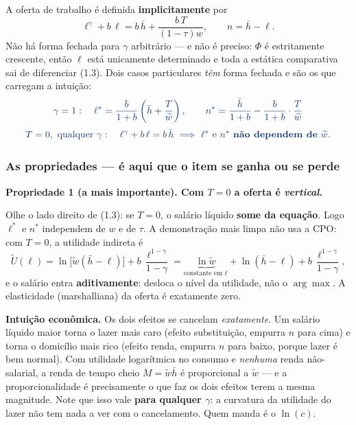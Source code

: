\documentclass[11pt, a4paper]{article}
\newcommand{\passo}[1]{\medskip\noindent\textbf{#1}\par\nobreak}
\newcommand{\intuicao}[1]{%
  \medskip\noindent\textcolor{midblue}{\textbf{Intuição econômica.}} #1\par}
\newcommand{\resp}[1]{%
  \ifmmode {\color{darkblue}#1}\else\textcolor{darkblue}{\textbf{#1}}\fi}
\newcommand{\stst}{^{\ast}}
\newcommand{\wt}{\widetilde{w}}
\begin{document}
\begin{tcolorbox}[theorybox, title={Resposta do item (a)}]
\small
A oferta de trabalho é definida \textbf{implicitamente} por
\[
\ell^{\gamma} + b\,\ell = b\,\bar h + \frac{b\,T}{(1-\tau)w},
\qquad n = \bar h - \ell .
\]
Não há forma fechada para $\gamma$ arbitrário --- e não é preciso: $\Phi$ é estritamente
crescente, então $\ell$ está unicamente determinado e toda a estática comparativa sai de
diferenciar (1.3). Dois casos particulares \emph{têm} forma fechada e são os que
carregam a intuição:
\[
\resp{\gamma = 1:\quad \ell\stst = \frac{b}{1+b}\left(\bar h + \frac{T}{\wt}\right),
\qquad
n\stst = \frac{\bar h}{1+b} - \frac{b}{1+b}\cdot\frac{T}{\wt}}
\]
\[
\resp{T = 0,\ \text{qualquer }\gamma:\quad \ell^{\gamma} + b\,\ell = b\,\bar h
\ \Longrightarrow\ \ell\stst \text{ e } n\stst \text{ \textbf{não dependem de} } \wt .}
\]
\end{tcolorbox}

\subsubsection*{As propriedades --- é aqui que o item se ganha ou se perde}

\passo{Propriedade 1 (a mais importante). Com $T=0$ a oferta é \emph{vertical}.}
Olhe o lado direito de (1.3): se $T=0$, o salário líquido \textbf{some da equação}. Logo
$\ell\stst$ e $n\stst$ independem de $w$ e de $\tau$. A demonstração mais limpa não usa a
CPO: com $T=0$, a utilidade indireta é
\[
\widetilde U(\ell) = \ln\!\big[\wt(\bar h-\ell)\big] + b\,\frac{\ell^{1-\gamma}}{1-\gamma}
= \underbrace{\ln \wt}_{\text{constante em }\ell} + \ln(\bar h-\ell)
  + b\,\frac{\ell^{1-\gamma}}{1-\gamma},
\]
e o salário entra \textbf{aditivamente}: desloca o nível da utilidade, não o
$\arg\max$. A elasticidade (marshalliana) da oferta é exatamente zero.

\intuicao{Os dois efeitos se cancelam \emph{exatamente}. Um salário líquido maior torna o
lazer mais caro (efeito substituição, empurra $n$ para cima) e torna o domicílio mais rico
(efeito renda, empurra $n$ para baixo, porque lazer é bem normal). Com utilidade
logarítmica no consumo e \emph{nenhuma} renda não-salarial, a renda de tempo cheio
$M = \wt\bar h$ é proporcional a $\wt$ --- e a proporcionalidade é precisamente o que faz
os dois efeitos terem a mesma magnitude. Note que isso vale \textbf{para qualquer
$\gamma$}: a curvatura da utilidade do lazer não tem nada a ver com o cancelamento. Quem
manda é o $\ln(c)$.}
\end{document}
